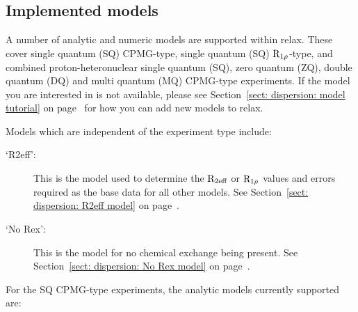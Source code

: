 \subsection{Implemented models}
\label{sect: dispersion: implemented models}

A number of analytic and numeric models are supported within relax.
These cover single quantum (SQ) CPMG-type, single quantum (SQ) $\mathrm{R}_{1\rho}$-type, and combined proton-heteronuclear single quantum (SQ), zero quantum (ZQ), double quantum (DQ) and multi quantum (MQ) CPMG-type experiments. 
If the model you are interested in is not available, please see Section~\ref{sect: dispersion: model tutorial} on page~\pageref{sect: dispersion: model tutorial} for how you can add new models to relax.

Models which are independent of the experiment type include:

\begin{description}
\item[`R2eff':]  This is the model used to determine the $\mathrm{R}_\textrm{2eff}$ or $\mathrm{R}_{1\rho}$ values and errors required as the base data for all other models.  See Section~\ref{sect: dispersion: R2eff model} on page~\pageref{sect: dispersion: R2eff model}.
\item[`No Rex':]  This is the model for no chemical exchange being present.  See Section~\ref{sect: dispersion: No Rex model} on page~\pageref{sect: dispersion: No Rex model}.
\end{description}


For the SQ CPMG-type experiments, the analytic models currently supported are:

